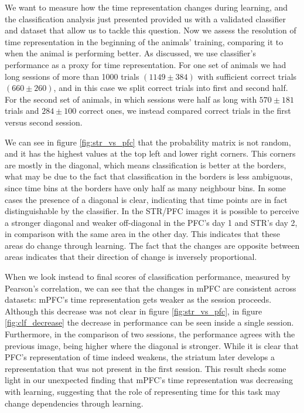 We want to measure how the time representation changes during learning, and the classification analysis just presented provided us with a validated classifier and dataset that allow us to tackle this question. Now we assess the resolution of time representation in the beginning of the animals' training, comparing it to when the animal is performing better. As discussed, we use classifier's performance as a proxy for time representation. For one set of animals we had long sessions of more than 1000 trials $(1149 \pm 384)$ with sufficient correct trials $(660 \pm 260)$, and in this case we split correct trials into first and second half. For the second set of animals, in which sessions were half as long with $570 \pm 181$ trials and $284\pm 100$ correct ones, we instead compared correct trials in the first versus second session. 


We can see in figure \ref{fig:str_vs_pfc} that the probability matrix is not random, and it has the highest values at the top left and lower right corners. This corners are mostly in the diagonal, which means classification is better at the borders, what may be due to the fact that classification in the borders is less ambiguous, since time bins at the borders have only half as many neighbour bins. In some cases the presence of a diagonal is clear, indicating that time points are in fact distinguishable by the classifier. In the STR/PFC images it is possible to perceive a stronger diagonal and weaker off-diagonal in the PFC's day 1 and STR's day 2, in comparison with the same area in the other day. This indicates that these areas do change through learning. The fact that the changes are opposite between areas indicates that their direction of change is inversely proportional.

When we look instead to final scores of classification performance, measured by Pearson's correlation, we can see that the changes in mPFC are consistent across datasets:  mPFC's time representation gets weaker as the session proceeds. Although this decrease was not clear in figure \ref{fig:str_vs_pfc}, in figure \ref{fig:clf_decrease} the decrease in performance can be seen inside a single session. Furthermore, in the comparison of two sessions, the performance agrees with the previous image, being higher where the diagonal is stronger. While it is clear that PFC's representation of time indeed weakens, the striatum later develops a representation that was not present in the first session. This result sheds some light in our unexpected finding that mPFC's time representation was decreasing with learning, suggesting that the role of representing time for this task may change dependencies through learning.

